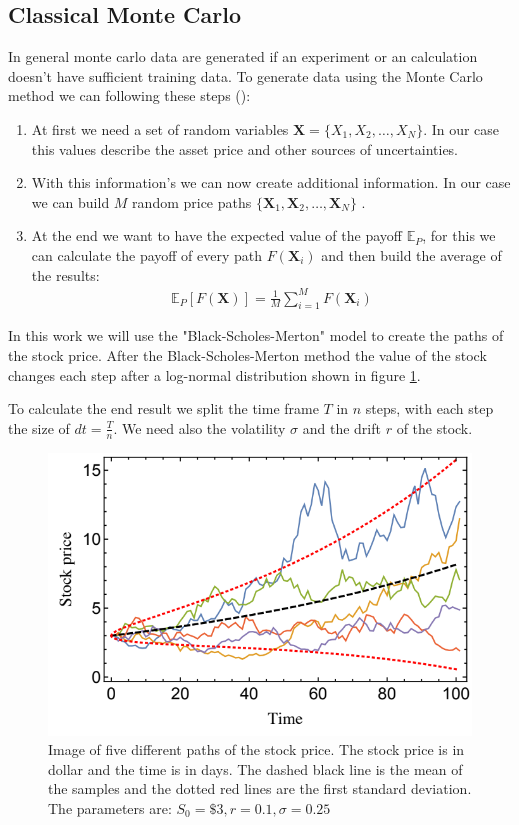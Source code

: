 \documentclass[../../main.tex]{subfiles}
\begin{document}
\subsection{Classical Monte Carlo}\label{sec: cmc}
In general monte carlo data are generated if an experiment or an calculation doesn't have sufficient training data. To generate data using the Monte Carlo method we can following these steps (\cite{1905.02666}):

\begin{enumerate}
	\item At first we need a set of random variables $\textbf{X}=\{X_1, X_2, \dots, X_N\}$. In our case this values describe the asset price and other sources of uncertainties.
	\item With this information's we can now create additional information. In our case we can build $M$ random price paths $\{ \textbf{X}_1, \textbf{X}_2, \dots, \textbf{X}_N \}$ .
	\item At the end we want to have the expected value of the payoff $\mathbb{E}_P$, for this we can calculate the payoff of every path $F(\textbf{X}_i)$ and then build the average of the results:
	    \begin{align}
	        \mathbb{E}_P[F(\textbf{X})] = \frac{1}{M} \sum_{i=1}^{M} F(\textbf{X}_i)
	    \end{align}
\end{enumerate}

In this work we will use the "Black-Scholes-Merton" model to create the paths of the stock price. After the Black-Scholes-Merton method the value of the stock changes each step after a log-normal distribution shown in figure \ref{fig:stockPaths}.

To calculate the end result we split the time frame $T$ in $n$ steps, with each step the size of $dt=\frac{T}{n}$. We need also the volatility $\sigma$ and the drift $r$ of the stock.

\begin{figure}[H]
  \begin{center}
    \includegraphics[width=0.5\linewidth]{../../../images/stock_path.png}
  \end{center}
  \caption{Image of five different paths of the stock price. The stock price is in dollar and the time is in days. The dashed black line is the mean of the samples and the dotted red lines are the first standard deviation. The parameters are: $S_0=\$3, r=0.1, \sigma=0.25$ \cite{1805.00109}}
  \label{fig:stockPaths}
\end{figure}
\end{document}
